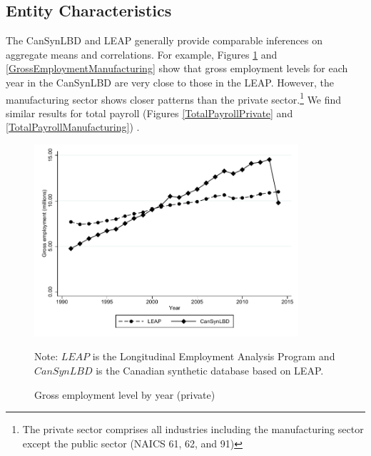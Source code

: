 
\newcommand{\TableNote}{$LEAP$ is the Longitudinal Employment Analysis Program and $CanSynLBD$ is the Canadian synthetic database based on LEAP. }

\subsection{Entity Characteristics}

The CanSynLBD and LEAP generally provide comparable inferences on aggregate means and correlations. For example, Figures \ref{GrossEmploymentPrivate} and \ref{GrossEmploymentManufacturing} show that gross employment levels for each year in the CanSynLBD are very close to those in the LEAP. However, the manufacturing sector shows closer patterns than the private sector.\footnote{The private sector comprises all industries including the manufacturing sector except the public sector  (NAICS 61, 62, and 91)} We find similar results for total payroll (Figures \ref{TotalPayrollPrivate} and  \ref{TotalPayrollManufacturing}) .

 
\begin{figure} [H]
\centering
\caption{Gross employment level by year (private)} \label{GrossEmploymentPrivate}
\includegraphics[height=2.8in, width=.7\linewidth]{graphs/Gross_employment_level_by_year_private_bw.pdf} 
\begin{minipage}{0.85\textwidth}
{\footnotesize Note: \TableNote \par}
\end{minipage}
\end{figure}


